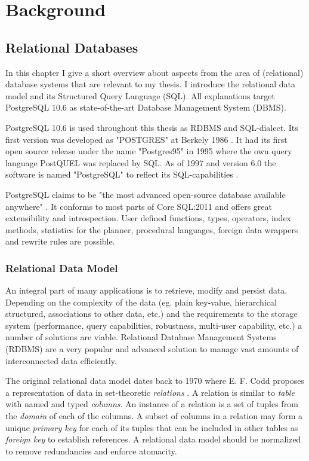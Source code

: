 \chapter{Background}\label{Introduction}

\section{Relational Databases}\label{theory}

In this chapter I give a short overview about aspects from the area of (relational) database systems that are relevant to my thesis. I introduce the relational data model and its Structured Query Language (SQL). All explanations target PostgreSQL 10.6 as state-of-the-art Database Management System (DBMS).

PostgreSQL 10.6 is used throughout this thesis as RDBMS and SQL-dialect. Its first version was developed as "POSTGRES" at Berkely 1986 \cite[xxxvi ff.]{psql}. It had its first open source release under the name "Postgres95" in 1995 where the own query language PostQUEL was replaced by SQL. As of 1997 and version 6.0 the software is named "PostgreSQL" to reflect its SQL-capabilities \cite[xxxvi ff.]{psql}.

PostgreSQL claims to be "the most advanced open-source database available anywhere" \cite[xxxvii]{psql}. It conforms to most parts of Core SQL:2011 \cite[S. 2198]{psql} and offers great extensibility and introspection. User defined functions, types, operators, index methods, statistics for the planner, procedural languages, foreign data wrappers and rewrite rules are possible. 

\subsection{Relational Data Model}
An integral part of many applications is to retrieve, modify and persist data. Depending on the complexity of the data (eg. plain key-value, hierarchical structured, associations to other data, etc.) and the requirements to the storage system (performance, query capabilities, robustness, multi-user capability, etc.) a number of solutions are viable. Relational Database Management Systems (RDBMS) are a very popular and advanced solution to manage vast amounts of interconnected data efficiently.

The original relational data model dates back to 1970 where E. F. Codd proposes a representation of data in set-theoretic \textit{relations} \cite{codd}. A relation is similar to \textit{table} with named and typed \textit{columns}. An instance of a relation is a set of tuples from the \textit{domain} of each of the columns. A subset of columns in a relation may form a unique \textit{primary key} for each of its tuples that can be included in other tables as \textit{foreign key} to establish references. A relational data model should be normalized to remove redundancies and enforce atomacity.

